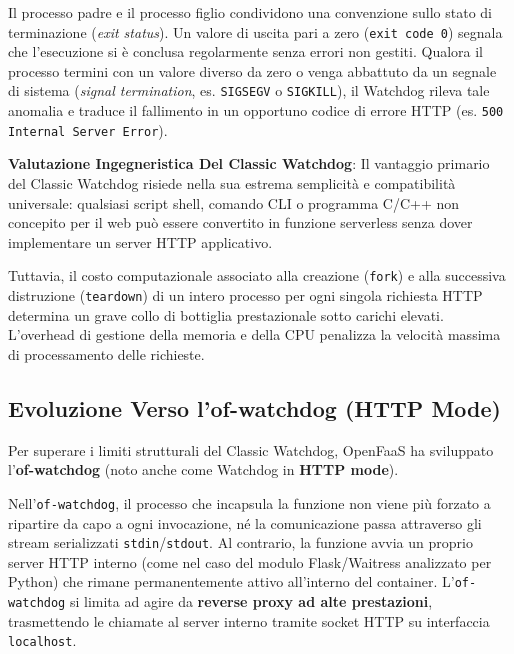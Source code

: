\documentclass[11pt, a4paper]{article}
\begin{document}
Il processo padre e il processo figlio condividono una convenzione sullo stato di terminazione (\emph{exit status}). Un valore di uscita pari a zero (\texttt{exit code 0}) segnala che l'esecuzione si è conclusa regolarmente senza errori non gestiti. Qualora il processo termini con un valore diverso da zero o venga abbattuto da un segnale di sistema (\emph{signal termination}, es. \texttt{SIGSEGV} o \texttt{SIGKILL}), il Watchdog rileva tale anomalia e traduce il fallimento in un opportuno codice di errore HTTP (es. \texttt{500 Internal Server Error}).

\textbf{Valutazione Ingegneristica Del Classic Watchdog}:
Il vantaggio primario del Classic Watchdog risiede nella sua estrema semplicità e compatibilità universale: qualsiasi script shell, comando CLI o programma C/C++ non concepito per il web può essere convertito in funzione serverless senza dover implementare un server HTTP applicativo.

Tuttavia, il costo computazionale associato alla creazione (\texttt{fork}) e alla successiva distruzione (\texttt{teardown}) di un intero processo per ogni singola richiesta HTTP determina un grave collo di bottiglia prestazionale sotto carichi elevati. L'overhead di gestione della memoria e della CPU penalizza la velocità massima di processamento delle richieste.

\subsection{Evoluzione Verso l'of-watchdog (HTTP Mode)}

Per superare i limiti strutturali del Classic Watchdog, OpenFaaS ha sviluppato l'\textbf{of-watchdog} (noto anche come Watchdog in \textbf{HTTP mode}).

Nell'\texttt{of-watchdog}, il processo che incapsula la funzione non viene più forzato a ripartire da capo a ogni invocazione, né la comunicazione passa attraverso gli stream serializzati \texttt{stdin}/\texttt{stdout}. Al contrario, la funzione avvia un proprio server HTTP interno (come nel caso del modulo Flask/Waitress analizzato per Python) che rimane permanentemente attivo all'interno del container. L'\texttt{of-watchdog} si limita ad agire da \textbf{reverse proxy ad alte prestazioni}, trasmettendo le chiamate al server interno tramite socket HTTP su interfaccia \texttt{localhost}.
\end{document}
